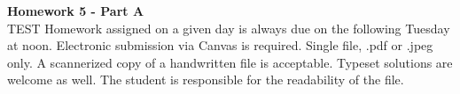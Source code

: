 \documentclass{article}
\begin{document}


{\bf Homework 5 - Part A}\\
TEST
Homework assigned on a given day is always due on the following Tuesday at noon. Electronic submission via Canvas is required. Single file, .pdf or .jpeg only.  A scannerized copy of a handwritten file is acceptable. Typeset solutions are welcome as well. The student is responsible for the readability of the file. 
\end{document}

